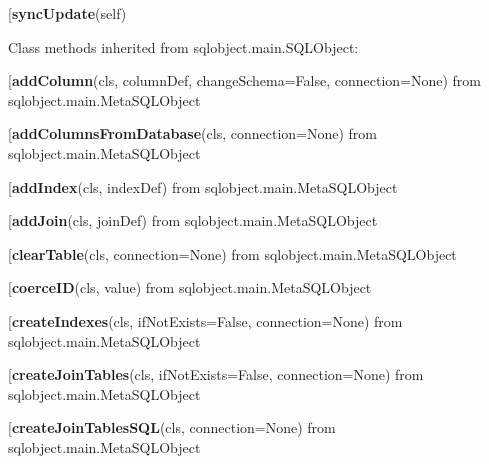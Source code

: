 \begin{description}\item[{\bf syncUpdate}(self)\end{description}


Class methods inherited from sqlobject.main.SQLObject:\\
\begin{description}\item[{\bf addColumn}(cls, columnDef, changeSchema=False, connection=None) from sqlobject.main.MetaSQLObject\end{description}

\begin{description}\item[{\bf addColumnsFromDatabase}(cls, connection=None) from sqlobject.main.MetaSQLObject\end{description}

\begin{description}\item[{\bf addIndex}(cls, indexDef) from sqlobject.main.MetaSQLObject\end{description}

\begin{description}\item[{\bf addJoin}(cls, joinDef) from sqlobject.main.MetaSQLObject\end{description}

\begin{description}\item[{\bf clearTable}(cls, connection=None) from sqlobject.main.MetaSQLObject\end{description}

\begin{description}\item[{\bf coerceID}(cls, value) from sqlobject.main.MetaSQLObject\end{description}

\begin{description}\item[{\bf createIndexes}(cls, ifNotExists=False, connection=None) from sqlobject.main.MetaSQLObject\end{description}

\begin{description}\item[{\bf createJoinTables}(cls, ifNotExists=False, connection=None) from sqlobject.main.MetaSQLObject\end{description}

\begin{description}\item[{\bf createJoinTablesSQL}(cls, connection=None) from sqlobject.main.MetaSQLObject\end{description}

